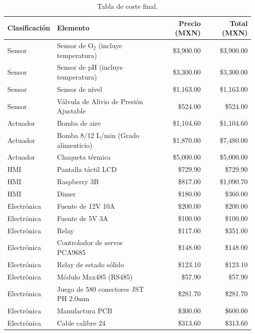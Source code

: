 \documentclass[11pt,tesis,twoside,openright,spanish]{upiiztt}
\begin{document}
\begin{table}[H]
\centering
\caption{Tabla de coste final.}
\label{tab:costos}
\small
\begin{tabular}{llrr}
\toprule
\textbf{Clasificación} & \textbf{Elemento} & \textbf{Precio (MXN)} & \textbf{Total (MXN)} \\
\midrule
Sensor      & Sensor de O$_2$ (incluye temperatura) & \$3,900.00 & \$3,900.00 \\
Sensor      & Sensor de pH (incluye temperatura)    & \$3,300.00 & \$3,300.00 \\
Sensor      & Sensor de nivel                       & \$1,163.00 & \$1,163.00 \\
Sensor      & Válvula de Alivio de Presión Ajustable & \$524.00  & \$524.00 \\
Actuador    & Bomba de aire                         & \$1,104.60 & \$1,104.60 \\
Actuador    & Bomba 8/12 L/min (Grado alimenticio)  & \$1,870.00 & \$7,480.00 \\
Actuador    & Chaqueta térmica                      & \$5,000.00 & \$5,000.00 \\
HMI         & Pantalla táctil LCD                   & \$729.90   & \$729.90 \\
HMI         & Raspberry 3B                          & \$817.00   & \$1,090.70 \\
HMI         & Dimer                                 & \$180.00   & \$360.00 \\
Electrónica & Fuente de 12V 10A                     & \$200.00   & \$200.00 \\
Electrónica & Fuente de 5V 3A                       & \$100.00   & \$100.00 \\
Electrónica & Relay                                 & \$117.00   & \$351.00 \\
Electrónica & Controlador de servos PCA9685         & \$148.00   & \$148.00 \\
Electrónica & Relay de estado sólido                & \$123.10   & \$123.10 \\
Electrónica & Módulo Max485 (RS485)                 & \$57.90    & \$57.90 \\
Electrónica & Juego de 580 conectores JST PH 2.0mm  & \$281.70   & \$281.70 \\
Electrónica & Manufactura PCB                       & \$300.00   & \$600.00 \\
Electrónica & Cable calibre 24                      & \$313.60   & \$313.60 \\

\end{tabular}
\end{table}
\end{document}
